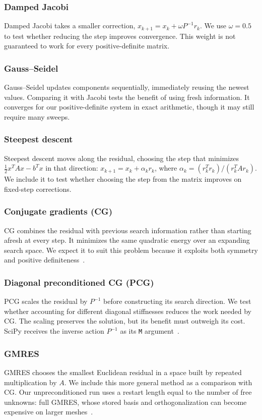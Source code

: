 \subsubsection*{Damped Jacobi}
Damped Jacobi takes a smaller correction,
$x_{k+1}=x_k+\omega P^{-1}r_k$. We use $\omega=0.5$ to test whether
reducing the step improves convergence. This weight is not guaranteed
to work for every positive-definite matrix.

\subsubsection*{Gauss--Seidel}
Gauss--Seidel updates components sequentially, immediately reusing the
newest values. Comparing it with Jacobi tests the benefit of using fresh
information. It converges for our positive-definite system in exact
arithmetic, though it may still require many sweeps.

\subsubsection*{Steepest descent}
Steepest descent moves along the residual, choosing the step that minimizes
$\tfrac12 x^TAx-b^Tx$ in that direction:
$x_{k+1}=x_k+\alpha_k r_k$, where
$\alpha_k=(r_k^Tr_k)/(r_k^TAr_k)$. We include it to test whether choosing
the step from the matrix improves on fixed-step corrections.

\subsubsection*{Conjugate gradients (CG)}
CG combines the residual with previous search information rather than
starting afresh at every step. It minimizes the same quadratic energy
over an expanding search space. We expect it to suit this problem because
it exploits both symmetry and positive definiteness~\cite{saad-iterative}.

\subsubsection*{Diagonal preconditioned CG (PCG)}
PCG scales the residual by $P^{-1}$ before constructing its search
direction. We test whether accounting for different diagonal stiffnesses
reduces the work needed by CG. The scaling preserves the solution, but
its benefit must outweigh its cost. SciPy receives the inverse action
$P^{-1}$ as its \texttt{M} argument~\cite{scipy-cg}.

\subsubsection*{GMRES}
GMRES chooses the smallest Euclidean residual in a space built by repeated
multiplication by $A$. We include this more general method as a comparison
with CG. Our unpreconditioned run uses a restart length equal to the number
of free unknowns: full GMRES, whose stored basis and orthogonalization can
become expensive on larger meshes~\cite{scipy-gmres}.

